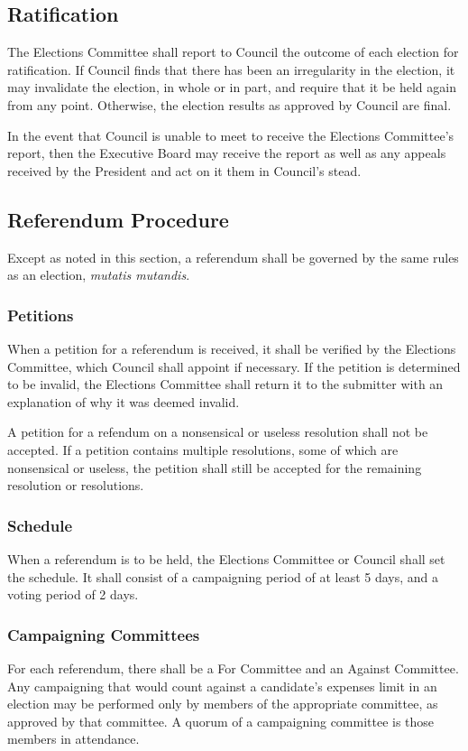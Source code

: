 \subsection{Ratification}
The Elections Committee shall report to Council the outcome of each election for
ratification. If Council finds that there has been an irregularity in the
election, it may invalidate the election, in whole or in part, and require that
it be held again from any point. Otherwise, the election results as approved by
Council are final.

In the event that Council is unable to meet to receive the Elections Committee's
report, then the Executive Board may receive the report as well as any appeals
received by the President and act on it them in Council's stead.

\subsection{Referendum Procedure}
Except as noted in this section, a referendum shall be governed by the same
rules as an election, \emph{mutatis mutandis}.

\subsubsection{Petitions}
When a petition for a referendum is received, it shall be verified by the
Elections Committee, which Council shall appoint if necessary. If the petition
is determined to be invalid, the Elections Committee shall return it to the
submitter with an explanation of why it was deemed invalid.

A petition for a refendum on a nonsensical or useless resolution shall not be
accepted. If a petition contains multiple resolutions, some of which are
nonsensical or useless, the petition shall still be accepted for the remaining
resolution or resolutions.

\subsubsection{Schedule}
When a referendum is to be held, the Elections Committee or Council shall set
the schedule. It shall consist of a campaigning period of at least 5 days, and a
voting period of 2 days.

\subsubsection{Campaigning Committees}
For each referendum, there shall be a For Committee and an Against Committee.
Any campaigning that would count against a candidate's expenses limit in an
election may be performed only by members of the appropriate committee, as
approved by that committee. A quorum of a campaigning committee is those members
in attendance.

